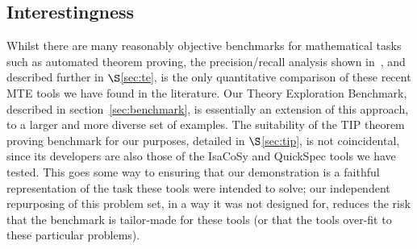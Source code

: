 \subsection{Interestingness}

Whilst there are many reasonably objective benchmarks for mathematical tasks
such as automated theorem proving, the precision/recall analysis shown
in~\cite{claessen2013automating}, and described further in $\S$\ref{sec:te}, is
the only quantitative comparison of these recent MTE tools we have found in the
literature. Our Theory Exploration Benchmark, described in
section~\ref{sec:benchmark}, is essentially an extension of this approach, to a
larger and more diverse set of examples. The suitability of the TIP theorem
proving benchmark for our purposes, detailed in $\S$\ref{sec:tip}, is not
coincidental, since its developers are also those of the IsaCoSy and QuickSpec
tools we have tested. This goes some way to ensuring that our demonstration is a
faithful representation of the task these tools were intended to solve; our
independent repurposing of this problem set, in a way it was not designed for,
reduces the risk that the benchmark is tailor-made for these tools (or that the
tools over-fit to these particular problems).



